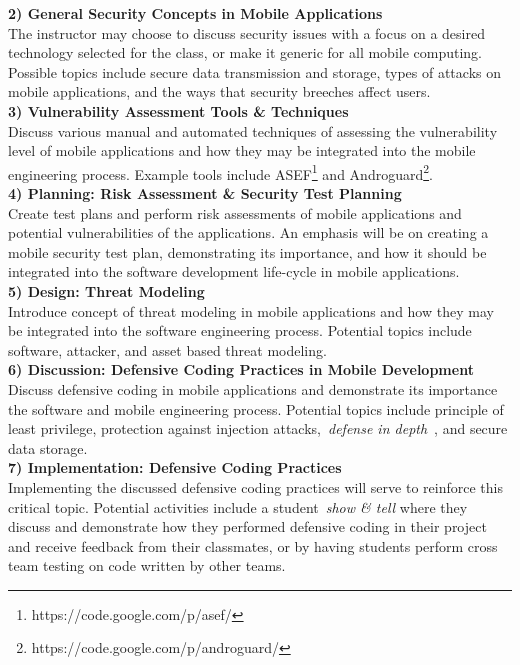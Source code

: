 \documentclass{sig-alternate}
\begin{document}
\textbf{2) General Security Concepts in Mobile Applications}\\
The instructor may choose to discuss security issues with a focus on a desired technology selected for the class, or make it generic for all mobile computing. Possible topics include secure data transmission and storage, types of attacks on mobile applications, and the ways that security breeches affect users.\\

\textbf{3) Vulnerability Assessment Tools \& Techniques }\\
Discuss various manual and automated techniques of assessing the vulnerability level of mobile applications and how they may be integrated into the mobile engineering process. Example tools include ASEF\footnote{https://code.google.com/p/asef/} and Androguard\footnote{https://code.google.com/p/androguard/}.\\

\textbf{4) Planning: Risk Assessment \& Security Test Planning}\\
Create test plans and perform risk assessments of mobile applications and potential vulnerabilities of the applications. An emphasis will be on creating a mobile security test plan, demonstrating its importance, and how it should be integrated into the software development life-cycle in mobile applications. \\

\textbf{5) Design: Threat Modeling}\\
Introduce concept of threat modeling in mobile applications and how they may be integrated into the software engineering process. Potential topics include software, attacker, and asset based threat modeling.\\

\textbf{6) Discussion: Defensive Coding Practices in Mobile Development}\\
Discuss defensive coding in mobile applications and demonstrate its importance the software and mobile engineering process. Potential topics include principle of least privilege, protection against injection attacks,~\emph{defense in depth}~\cite{defenseindepth_url}, and secure data storage. \\

\textbf{7) Implementation: Defensive Coding Practices}\\
Implementing the discussed defensive coding practices will serve to reinforce this critical topic. Potential activities include a student~\emph{show \& tell} where they discuss and demonstrate how they performed defensive coding in their project and receive feedback from their classmates, or by having students perform cross team testing on code written by other teams.
\end{document}
